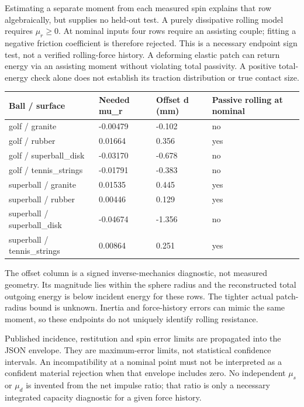 \documentclass[10pt,a4paper]{article}
\begin{document}
Estimating a separate moment from each measured spin explains that row algebraically,
but supplies no held-out test. A purely dissipative rolling model requires $\mu_r\ge0$.
At nominal inputs four rows require an assisting couple; fitting a negative friction
coefficient is therefore rejected. This is a necessary endpoint sign test, not
a verified rolling-force history. A deforming elastic patch can return energy via
an assisting moment without violating total passivity. A positive total-energy
check alone does not establish its traction distribution or true contact size.
\begin{center}\footnotesize\setlength{\tabcolsep}{4pt}
\begin{tabular}{llll}
\hline
Ball / surface & Needed mu\_r & Offset d (mm) & Passive rolling at nominal\\\hline
golf / granite & -0.00479 & -0.102 & no\\
golf / rubber & 0.01664 & 0.356 & yes\\
golf / superball\_disk & -0.03170 & -0.678 & no\\
golf / tennis\_strings & -0.01791 & -0.383 & no\\
superball / granite & 0.01535 & 0.445 & yes\\
superball / rubber & 0.00446 & 0.129 & yes\\
superball / superball\_disk & -0.04674 & -1.356 & no\\
superball / tennis\_strings & 0.00864 & 0.251 & yes\\
\hline\end{tabular}\end{center}
The offset column is a signed inverse-mechanics diagnostic, not measured geometry.
Its magnitude lies within the sphere radius and the reconstructed total outgoing
energy is below incident energy for these rows. The tighter actual patch-radius
bound is unknown. Inertia and force-history errors can mimic the same moment, so
these endpoints do not uniquely identify rolling resistance.

Published incidence, restitution and spin error limits are propagated into the JSON
envelope. They are maximum-error limits, not statistical confidence intervals.
An incompatibility at a nominal point must not be interpreted as a confident material
rejection when that envelope includes zero. No independent $\mu_s$ or $\mu_d$ is
invented from the net impulse ratio; that ratio is only a necessary integrated
capacity diagnostic for a given force history.
\end{document}
